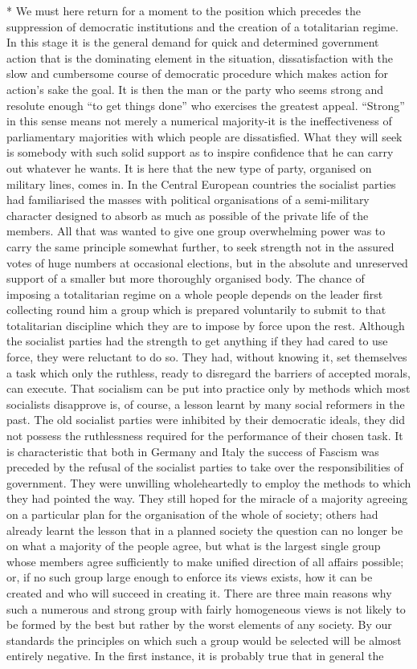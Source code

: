 \documentclass[11pt,openany]{book}
\begin{document}
* We must here return for a moment to the position which precedes the suppression of democratic institutions and the creation of a totalitarian regime. In this stage it is the general demand for quick and determined government action that is the dominating element in the situation, dissatisfaction with the slow and cumbersome course of democratic procedure which makes action for action's sake the goal. It is then the man or the party who seems strong and resolute enough ``to get things done'' who exercises the greatest appeal. ``Strong'' in this sense means not merely a numerical majority-it is the ineffectiveness of parliamentary majorities with which people are dissatisfied. What they will seek is somebody with such solid support as to inspire confidence that he can carry out whatever he wants. It is here that the new type of party, organised on military lines, comes in. In the Central European countries the socialist parties had familiarised the masses with political organisations of a semi-military character designed to absorb as much as possible of the private life of the members. All that was wanted to give one group overwhelming power was to carry the same principle somewhat further, to seek strength not in the assured votes of huge numbers at occasional elections, but in the absolute and unreserved support of a smaller but more thoroughly organised body. The chance of imposing a totalitarian regime on a whole people depends on the leader first collecting round him a group which is prepared voluntarily to submit to that totalitarian discipline which they are to impose by force upon the rest. Although the socialist parties had the strength to get anything if they had cared to use force, they were reluctant to do so. They had, without knowing it, set themselves a task which only the ruthless, ready to disregard the barriers of accepted morals, can execute. That socialism can be put into practice only by methods which most socialists disapprove is, of course, a lesson learnt by many social reformers in the past. The old socialist parties were inhibited by their democratic ideals, they did not possess the ruthlessness required for the performance of their chosen task. It is characteristic that both in Germany and Italy the success of Fascism was preceded by the refusal of the socialist parties to take over the responsibilities of government. They were unwilling wholeheartedly to employ the methods to which they had pointed the way. They still hoped for the miracle of a majority agreeing on a particular plan for the organisation of the whole of society; others had already learnt the lesson that in a planned society the question can no longer be on what a majority of the people agree, but what is the largest single group whose members agree sufficiently to make unified direction of all affairs possible; or, if no such group large enough to enforce its views exists, how it can be created and who will succeed in creating it. There are three main reasons why such a numerous and strong group with fairly homogeneous views is not likely to be formed by the best but rather by the worst elements of any society. By our standards the principles on which such a group would be selected will be almost entirely negative. In the first instance, it is probably true that in general the 
\end{document}
